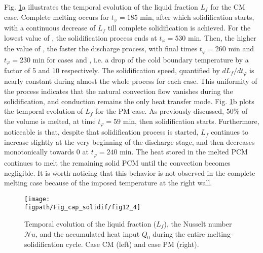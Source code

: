 \noindent Fig. \ref{fig:Lf_full_1D_profil}a illustrates the temporal evolution of the liquid fraction $L_f$ for the CM case. 
Complete melting occurs for $t_{\varphi} =185$ min, after which solidification starts, with a continuous decrease of $L_f$ till complete solidification is achieved. 
For the lowest value of , the solidification process ends at $t_{\varphi} = 530$ min. 
Then, the higher the value of , the faster the discharge process,
with final times $t_{\varphi} = 260$ min and $t_{\varphi} = 230$ min for cases  and , i.e. a drop of the cold boundary temperature by a factor of 5 and 10 respectively. 
The solidification speed, quantified by $d L_f/ d t_{\varphi}$ is  nearly constant during almost the whole process for each case.  
This uniformity of the process indicates that the natural convection flow vanishes during the solidification, and conduction remains the only heat transfer mode. 
Fig. \ref{fig:Lf_full_1D_profil}b plots the temporal evolution of $L_f$ for the PM case. 
As previously discussed, $50\%$ of the volume is melted, at time $t_{\varphi} = 59$ min, then solidification starts. 
Furthermore, noticeable is that, despite that solidification process is started, $L_f$ continues to increase slightly at the very beginning of the discharge stage, and then decreases monotonically towards $0$ at $t_{\varphi} = 240$ min.
The heat stored in the melted PCM continues to melt the remaining solid PCM until the convection becomes negligible.
It is worth noticing that this behavior is not observed in the complete melting case because of the imposed temperature at the right wall.  


\begin{figure}
\begin{center}
\begin{minipage}[t]{0.9\textwidth}
	\texttt{[image: \\figpath/Fig\_cap\_solidif/fig12\_4]}
\end{minipage}
\end{center}
\caption{Temporal evolution of the  liquid fraction ($L_f$), the Nusselt number $\mathcal{N}\!u$, and the accumulated heat input $Q_0$ during the entire melting-solidification cycle. Case CM  (left) and  case PM  (right).}\label{fig:Lf_full_1D_profil}
\end{figure}

